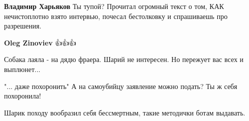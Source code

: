 \begin{itemize}
\begin{itemize}
 
\textbf{Владимир Харьяков} Ты тупой? Прочитал огромный текст о том, КАК нечистоплотно взято интервью, почесал бестолковку и спрашиваешь про разрешения.

 
\textbf{Oleg Zinoviev} 👍👍👍

\end{itemize}

 
Собака лаяла - на дядю фраера. Шарий не интересен. Но пережует вас всех и выплюнет...

 
"... даже похоронить" А на самоубийцу заявление можно подать? Ты ж себя похоронила!\Laughey[1.0][white]

\begin{itemize}
 
Шарик походу вообразил себя бессмертным, такие методички ботам выдавать.

 

\end{itemize}
\end{itemize}
